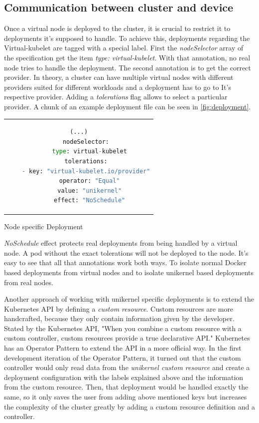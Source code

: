 \subsection{Communication between cluster and device}
Once a virtual node is deployed to the cluster, it is crucial to restrict it to deployments it's supposed to handle. To achieve this, deployments regarding the Virtual-kubelet are tagged with a special label. First the \textit{nodeSelector} array of the specification get the item \textit{type: virtual-kubelet}. With that annotation, no real node tries to handle the deployment. The second annotation is to get the correct provider. In theory, a cluster can have multiple virtual nodes with different providers suited for different workloads and a deployment has to go to It's respective provider. Adding a \textit{tolerations} flag allows to select a particular provider. A chunk of an example deployment file can be seen in \ref{fig:deployment}.

\begin{code}[htpb]
  \centering
  \begin{tabular}{c}
  \begin{lstlisting}[language=python]
    (...)
    nodeSelector:
      type: virtual-kubelet
    tolerations:
    - key: "virtual-kubelet.io/provider"
      operator: "Equal"
      value: "unikernel"
      effect: "NoSchedule"
\end{lstlisting}
\end{tabular}
\caption{Node specific Deployment}\label{fig:deployment}
\end{code}
\textit{NoSchedule} effect protects real deployments from being handled by a virtual node. A pod without the exact tolerations will not be deployed to the node. It's easy to see that all that annotations work both ways. To isolate normal Docker based deployments from virtual nodes and to isolate unikernel based deployments from real nodes.

Another approach of working with unikernel specific deployments is to extend the Kubernetes API by defining a \textit{custom resource}. Custom resources are more handcrafted, because they only contain information given by the developer. Stated by the Kubernetes API, "When you combine a custom resource with a custom controller, custom resources provide a true declarative API." Kubernetes has an Operator Pattern to extend the API in a more official way. In the first development iteration of the Operator Pattern, it turned out that the custom controller would only read data from the \textit{unikernel custom resource} and create a deployment configuration with the labels explained above and the information from the custom resource. Then, that deployment would be handled exactly the same, so it only saves the user from adding above mentioned keys but increases the complexity of the cluster greatly by adding a custom resource definition and a controller.

